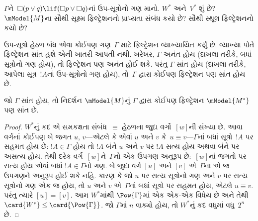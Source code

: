 \begin{prob}
  $\Gamma$ને~$\Box(p \lor q) \lif (\Box p \lor \Box q)$નાં
  ઉપ-સૂત્રોનો ગણ માનો. $W^*$ અને~$V^*$ શું છે?
  $\mModel{M}$ના સૌથી સૂક્ષ્મ ફિલ્ટ્રેશનનો પ્રાપ્યતા સંબંધ કયો છે?
  સૌથી સ્થૂલ ફિલ્ટ્રેશનનો કયો છે?
\end{prob}
\endgroup

\begingroup
\makeatletter{}\makeatother


\label{guunit:OLP-0455}


ઉપ-સૂત્રો હેઠળ બંધ એવા કોઈપણ ગણ~$\Gamma$ માટે ફિલ્ટ્રેશન
વ્યાખ્યાયિત કર્યું છે. વ્યાખ્યા પોતે ફિલ્ટ્રેશન સાંત હશે એની ખાતરી
આપતી નથી. ખરેખર, $\Gamma$ અનંત હોય (દાખલા તરીકે, બધાં
સૂત્રોનો ગણ હોય), તો ફિલ્ટ્રેશન પણ અનંત હોઈ શકે. પરંતુ
$\Gamma$ સાંત હોય (દાખલા તરીકે, આપેલા સૂત્ર~$!A$નાં
ઉપ-સૂત્રોનો ગણ હોય), તો~$\Gamma$ દ્વારા કોઈપણ ફિલ્ટ્રેશન
પણ સાંત હોય છે.

\begin{prop}
  જો $\Gamma$ સાંત હોય, તો નિદર્શન $\mModel{M}$નું $\Gamma$ દ્વારા
  કોઈપણ ફિલ્ટ્રેશન $\mModel{M^*}$ પણ સાંત છે.
\end{prop}

\begin{proof}
  $W^*$નું કદ એ સમકક્ષતા સંબંધ~$\equiv$ હેઠળના જુદા વર્ગો~$[w]$ની
  સંખ્યા છે. આવા વર્ગનાં કોઈપણ બે જગત $u$, $v$—એટલે કે એવાં
  $u$ અને $v$ કે~$u \equiv v$—$\Gamma$નાં બધાં
  સૂત્રો~$!A$ પર સહમત હોય છે: $!A \in \Gamma$ હોય તો $!A$
  બંને $u$ અને $v$ પર $!A$ સત્ય હોય અથવા બંને પર અસત્ય હોય. તેથી દરેક
  વર્ગ~$[w]$ને~$\Gamma$નો એક ઉપગણ અનુરૂપ છે:~$[w]$નાં જગતો પર
  સત્ય હોય એવાં બધાં $!A \in \Gamma$નો ગણ. બે જુદા વર્ગ
  $[u]$ અને $[v]$ એ~$\Gamma$ના એ જ ઉપગણને અનુરૂપ હોઈ શકે નહિ. કારણ કે જો
  $u$ પર સત્ય સૂત્રોનો ગણ અને $v$ પર સત્ય સૂત્રોનો
  ગણ એક જ હોય, તો $u$ અને $v$ એ~$\Gamma$નાં બધાં સૂત્રો પર
  સહમત હોય, એટલે $u \equiv v$. પરંતુ ત્યારે $[u] = [v]$.
  આમ $W^*$માંથી $\Pow{\Gamma}$માં એક એક-એક વિધેય છે અને
  તેથી $\card{W^*} \le \card{\Pow{\Gamma}}$. જો $\Gamma$માં $n$
  વાક્યો હોય, તો $W^*$નું કદ વધુમાં વધુ~$2^n$ છે.
\end{proof}
\endgroup

\begingroup
\makeatletter{}\makeatother


\label{guunit:OLP-0456}


